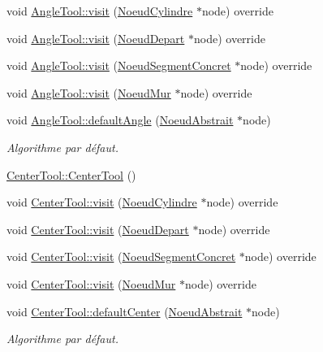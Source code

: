 \begin{DoxyCompactItemize}
void \hyperlink{group__inf2990_ga925fee2b000babaae1c7947a732a0bba}{Angle\-Tool\-::visit} (\hyperlink{class_noeud_cylindre}{Noeud\-Cylindre} $\ast$node) override
\item 
void \hyperlink{group__inf2990_gaaa2fc24bde51948c2288c375f19d70ae}{Angle\-Tool\-::visit} (\hyperlink{class_noeud_depart}{Noeud\-Depart} $\ast$node) override
\item 
void \hyperlink{group__inf2990_ga0209990747f5f623c71076c02a3ed018}{Angle\-Tool\-::visit} (\hyperlink{class_noeud_segment_concret}{Noeud\-Segment\-Concret} $\ast$node) override
\item 
void \hyperlink{group__inf2990_ga5bf124eb8955a829e87743cc6a737b49}{Angle\-Tool\-::visit} (\hyperlink{class_noeud_mur}{Noeud\-Mur} $\ast$node) override
\item 
void \hyperlink{group__inf2990_gac864ba35d8073ed9564a0a90d4df351d}{Angle\-Tool\-::default\-Angle} (\hyperlink{class_noeud_abstrait}{Noeud\-Abstrait} $\ast$node)
\begin{DoxyCompactList}\small\item\em Algorithme par défaut. \end{DoxyCompactList}\item 
\hyperlink{group__inf2990_ga3814d534b50e7dff7fbd7efef552685d}{Center\-Tool\-::\-Center\-Tool} ()
\item 
void \hyperlink{group__inf2990_ga9ceff880a444e12bc6b4dab4313c1809}{Center\-Tool\-::visit} (\hyperlink{class_noeud_cylindre}{Noeud\-Cylindre} $\ast$node) override
\item 
void \hyperlink{group__inf2990_ga8417547d629ccacfa218979e6ba6cdf5}{Center\-Tool\-::visit} (\hyperlink{class_noeud_depart}{Noeud\-Depart} $\ast$node) override
\item 
void \hyperlink{group__inf2990_gac441b1692c3b057050ced592ba372263}{Center\-Tool\-::visit} (\hyperlink{class_noeud_segment_concret}{Noeud\-Segment\-Concret} $\ast$node) override
\item 
void \hyperlink{group__inf2990_ga13d2bac067f4262be4fd60c302a07124}{Center\-Tool\-::visit} (\hyperlink{class_noeud_mur}{Noeud\-Mur} $\ast$node) override
\item 
void \hyperlink{group__inf2990_gab64cc9d2d491c0bd04a1efc4756740df}{Center\-Tool\-::default\-Center} (\hyperlink{class_noeud_abstrait}{Noeud\-Abstrait} $\ast$node)
\begin{DoxyCompactList}\small\item\em Algorithme par défaut. \end{DoxyCompactList}\item 

\end{DoxyCompactItemize}
